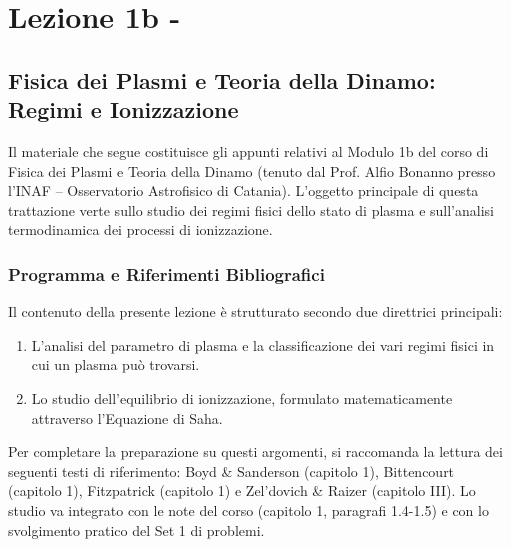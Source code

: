 \chapter{Lezione 1b - }

\section{Fisica dei Plasmi e Teoria della Dinamo: Regimi e Ionizzazione}

Il materiale che segue costituisce gli appunti relativi al Modulo 1b del corso di Fisica dei Plasmi e Teoria della Dinamo (tenuto dal Prof. Alfio Bonanno presso l'INAF – Osservatorio Astrofisico di Catania). L'oggetto principale di questa trattazione verte sullo studio dei regimi fisici dello stato di plasma e sull'analisi termodinamica dei processi di ionizzazione.

\subsection{Programma e Riferimenti Bibliografici}
Il contenuto della presente lezione è strutturato secondo due direttrici principali:
\begin{enumerate}
\item L'analisi del parametro di plasma e la classificazione dei vari regimi fisici in cui un plasma può trovarsi.
\item Lo studio dell'equilibrio di ionizzazione, formulato matematicamente attraverso l'Equazione di Saha.
\end{enumerate}

Per completare la preparazione su questi argomenti, si raccomanda la lettura dei seguenti testi di riferimento: Boyd \& Sanderson (capitolo 1), Bittencourt (capitolo 1), Fitzpatrick (capitolo 1) e Zel'dovich \& Raizer (capitolo III). Lo studio va integrato con le note del corso (capitolo 1, paragrafi 1.4-1.5) e con lo svolgimento pratico del Set 1 di problemi.

